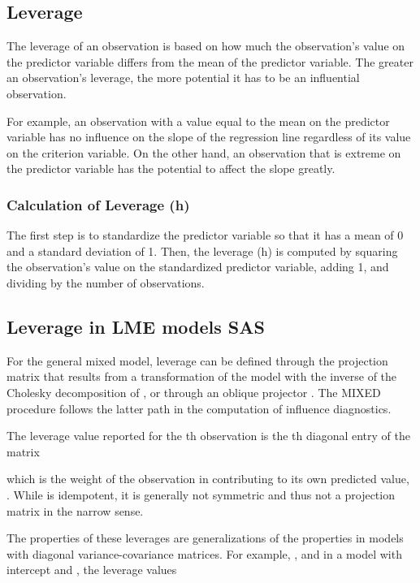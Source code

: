 \documentclass[12pt, a4paper]{article}
\begin{document}
\subsection{Leverage}
The leverage of an observation is based on how much the observation's value on the predictor variable differs from the mean of the predictor variable. The greater an observation's leverage, the more potential it has to be an influential observation. 
			
For example, an observation with a value equal to the mean on the predictor variable has no influence on the slope of the regression line regardless of its value on the criterion variable. On the other hand, an observation that is extreme on the predictor variable has the potential to affect the slope greatly.
			
\subsubsection{Calculation of Leverage (h)}
The first step is to standardize the predictor variable so that it has a mean of 0 and a standard deviation of 1. Then, the leverage (h) is computed by squaring the observation's value on the standardized predictor variable, adding 1, and dividing by the number of observations.
			

\subsection{Leverage in LME models SAS}

For the general mixed model, leverage can be defined through the projection matrix that results from a transformation of the model with the inverse of the Cholesky decomposition of , or through an oblique projector \citep{schabenberger}. The MIXED procedure follows the latter path in the computation of influence diagnostics. 


The leverage value reported for the th observation is the th diagonal entry of the matrix

which is the weight of the observation in contributing to its own predicted value, .
While  is idempotent, it is generally not symmetric and thus not a projection matrix in the narrow sense.

The properties of these leverages are generalizations of the properties in models with diagonal variance-covariance matrices. For example, , and in a model with intercept and , the leverage values
\end{document}
